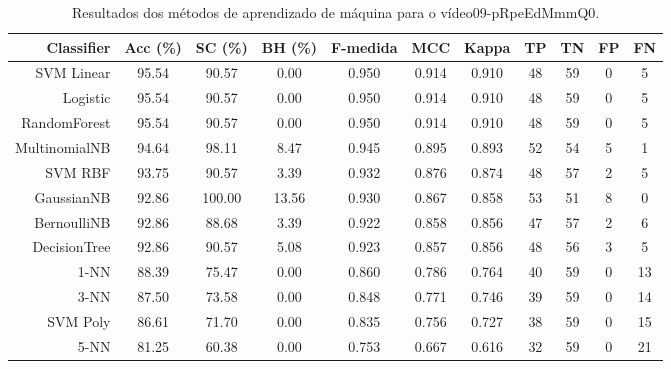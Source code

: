 \begin{table}[!htb]
\centering
\caption{Resultados dos métodos de aprendizado de máquina para o vídeo09-pRpeEdMmmQ0.}
\label{tab:09-pRpeEdMmmQ0}
\begin{tabular}{r|c|c|c|c|c|c|c|c|c|c}
\hline\hline
Classifier & Acc (\%) & SC (\%) & BH (\%) & F-medida & MCC & Kappa & TP & TN & FP & FN \\ \hline
SVM Linear & 95.54 & 90.57 & 0.00 & 0.950 & 0.914 & 0.910 & 48 & 59 & 0 & 5 \\ 
Logistic & 95.54 & 90.57 & 0.00 & 0.950 & 0.914 & 0.910 & 48 & 59 & 0 & 5 \\ 
RandomForest & 95.54 & 90.57 & 0.00 & 0.950 & 0.914 & 0.910 & 48 & 59 & 0 & 5 \\ 
MultinomialNB & 94.64 & 98.11 & 8.47 & 0.945 & 0.895 & 0.893 & 52 & 54 & 5 & 1 \\ 
SVM RBF & 93.75 & 90.57 & 3.39 & 0.932 & 0.876 & 0.874 & 48 & 57 & 2 & 5 \\ 
GaussianNB & 92.86 & 100.00 & 13.56 & 0.930 & 0.867 & 0.858 & 53 & 51 & 8 & 0 \\ 
BernoulliNB & 92.86 & 88.68 & 3.39 & 0.922 & 0.858 & 0.856 & 47 & 57 & 2 & 6 \\ 
DecisionTree & 92.86 & 90.57 & 5.08 & 0.923 & 0.857 & 0.856 & 48 & 56 & 3 & 5 \\ 
1-NN & 88.39 & 75.47 & 0.00 & 0.860 & 0.786 & 0.764 & 40 & 59 & 0 & 13 \\ 
3-NN & 87.50 & 73.58 & 0.00 & 0.848 & 0.771 & 0.746 & 39 & 59 & 0 & 14 \\ 
SVM Poly & 86.61 & 71.70 & 0.00 & 0.835 & 0.756 & 0.727 & 38 & 59 & 0 & 15 \\ 
5-NN & 81.25 & 60.38 & 0.00 & 0.753 & 0.667 & 0.616 & 32 & 59 & 0 & 21 \\ 
\hline\hline
\end{tabular}
\end{table}
